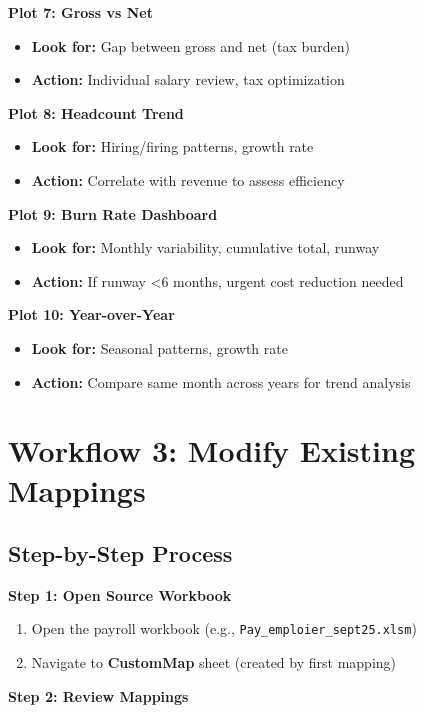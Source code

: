 \textbf{Plot 7: Gross vs Net}
\begin{itemize}
    \item \textbf{Look for:} Gap between gross and net (tax burden)
    \item \textbf{Action:} Individual salary review, tax optimization
\end{itemize}

\textbf{Plot 8: Headcount Trend}
\begin{itemize}
    \item \textbf{Look for:} Hiring/firing patterns, growth rate
    \item \textbf{Action:} Correlate with revenue to assess efficiency
\end{itemize}

\textbf{Plot 9: Burn Rate Dashboard}
\begin{itemize}
    \item \textbf{Look for:} Monthly variability, cumulative total, runway
    \item \textbf{Action:} If runway <6 months, urgent cost reduction needed
\end{itemize}

\textbf{Plot 10: Year-over-Year}
\begin{itemize}
    \item \textbf{Look for:} Seasonal patterns, growth rate
    \item \textbf{Action:} Compare same month across years for trend analysis
\end{itemize}

\section{Workflow 3: Modify Existing Mappings}

\subsection{Step-by-Step Process}

\textbf{Step 1: Open Source Workbook}

\begin{enumerate}
    \item Open the payroll workbook (e.g., \texttt{Pay\_emploier\_sept25.xlsm})
    \item Navigate to \textbf{CustomMap} sheet (created by first mapping)
\end{enumerate}

\textbf{Step 2: Review Mappings}

